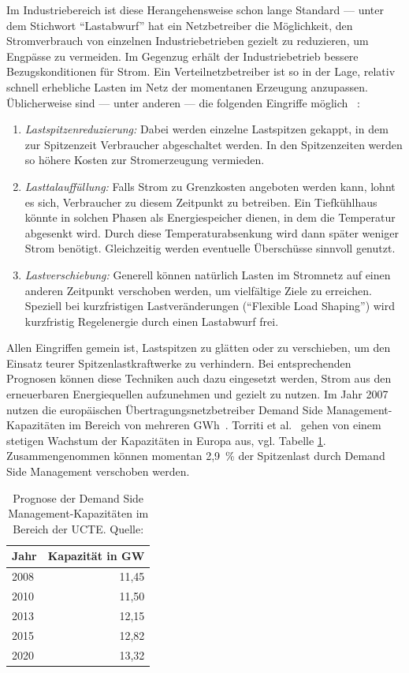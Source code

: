 \documentclass[logo]{fhgart}
\begin{document}
Im Industriebereich ist diese Herangehensweise schon lange Standard ---
unter dem Stichwort "`Lastabwurf"' hat ein Netzbetreiber die
Möglichkeit, den Stromverbrauch von einzelnen Industriebetrieben gezielt
zu reduzieren, um Engpässe zu vermeiden. Im Gegenzug erhält der
Industriebetrieb bessere Bezugskonditionen für Strom. Ein
Verteilnetzbetreiber ist so in der Lage, relativ schnell erhebliche
Lasten im Netz der momentanen Erzeugung anzupassen. Üblicherweise sind
--- unter anderen --- die folgenden Eingriffe möglich \cite[S.
23f]{wiechmann08lastmanagement}~\cite[S. 85ff]{bmwi06eenergy}:

\begin{enumerate}
  \item \emph{Lastspitzenreduzierung:} Dabei werden einzelne Lastspitzen
    gekappt, in dem zur Spitzenzeit Verbraucher abgeschaltet werden. In
    den Spitzenzeiten werden so höhere Kosten zur Stromerzeugung
    vermieden.
  \item \emph{Lasttalauffüllung:} Falls Strom zu Grenzkosten angeboten
    werden kann, lohnt es sich, Verbraucher zu diesem Zeitpunkt zu
    betreiben. Ein Tiefkühlhaus könnte in solchen Phasen als
    Energiespeicher dienen, in dem die Temperatur abgesenkt wird. Durch
    diese Temperaturabsenkung wird dann später weniger Strom benötigt.
    Gleichzeitig werden eventuelle Überschüsse sinnvoll genutzt.
  \item \emph{Lastverschiebung:} Generell können natürlich Lasten im
    Stromnetz auf einen anderen Zeitpunkt verschoben werden, um
    vielfältige Ziele zu erreichen. Speziell bei kurzfristigen
    Lastveränderungen ("`Flexible Load Shaping"') wird kurzfristig
    Regelenergie durch einen Lastabwurf frei.
\end{enumerate}

Allen Eingriffen gemein ist, Lastspitzen zu glätten oder zu verschieben,
um den Einsatz teurer Spitzenlastkraftwerke zu verhindern. Bei
entsprechenden Prognosen können diese Techniken auch dazu eingesetzt
werden, Strom aus den erneuerbaren Energiequellen aufzunehmen und
gezielt zu nutzen. Im Jahr 2007 nutzen die europäischen
Übertragungsnetzbetreiber Demand Side Management-Kapazitäten im Bereich von
mehreren GWh~\cite{etso07demand}. Torriti et al.~\cite{torriti10demand}
gehen von einem stetigen Wachstum der Kapazitäten in Europa aus, vgl.
Tabelle \ref{tab:drforecast}. Zusammengenommen können momentan 2,9~\% der
Spitzenlast durch Demand Side Management verschoben werden.

\begin{table}
  \centering
  \begin{tabular}{|l|r|}
    \hline
    Jahr & Kapazität in GW \\
    \hline
    2008 & 11,45\\
    2010 & 11,50\\
    2013 & 12,15 \\
    2015 & 12,82 \\
    2020 & 13,32 \\
    \hline
  \end{tabular}
  \caption{Prognose der Demand Side Management-Kapazitäten im Bereich
  der UCTE. Quelle: \cite{torriti10demand}}
  \label{tab:drforecast}
\end{table}
\end{document}
